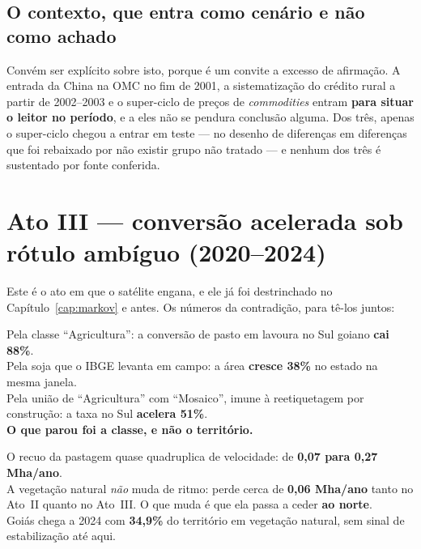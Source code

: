 \subsection{O contexto, que entra como cenário e não como achado}

Convém ser explícito sobre isto, porque é um convite a excesso de afirmação. A
entrada da China na OMC no fim de 2001, a sistematização do crédito rural a
partir de 2002--2003 e o super-ciclo de preços de \emph{commodities} entram
\textbf{para situar o leitor no período}, e a eles não se pendura conclusão
alguma. Dos três, apenas o super-ciclo chegou a entrar em teste --- no desenho
de diferenças em diferenças que foi rebaixado por não existir grupo não tratado
--- e nenhum dos três é sustentado por fonte conferida.

\section{Ato III --- conversão acelerada sob rótulo ambíguo (2020--2024)}

Este é o ato em que o satélite engana, e ele já foi destrinchado no
Capítulo~\ref{cap:markov} e antes. Os números da contradição, para tê-los
juntos:

\begin{ancora}
Pela classe ``Agricultura'': a conversão de pasto em lavoura no Sul goiano
\textbf{cai 88\%}. \\
Pela soja que o IBGE levanta em campo: a área \textbf{cresce 38\%} no estado na
mesma janela. \\
Pela união de ``Agricultura'' com ``Mosaico'', imune à reetiquetagem por
construção: a taxa no Sul \textbf{acelera 51\%}. \\[4pt]
\textbf{O que parou foi a classe, e não o território.}
\end{ancora}

\begin{ancora}
O recuo da pastagem quase quadruplica de velocidade: de \textbf{0,07 para 0,27
Mha/ano}. \\
A vegetação natural \emph{não} muda de ritmo: perde cerca de \textbf{0,06
Mha/ano} tanto no Ato~II quanto no Ato~III. O que muda é que ela passa a ceder
\textbf{ao norte}. \\
Goiás chega a 2024 com \textbf{34,9\%} do território em vegetação natural, sem
sinal de estabilização até aqui.
\end{ancora}

